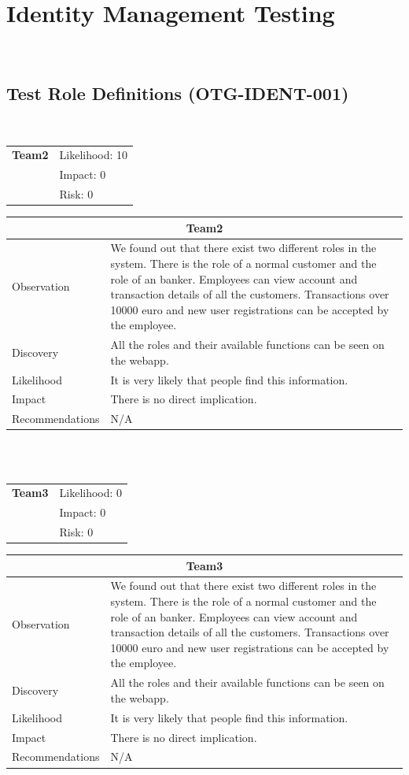 \documentclass[headsepline,footsepline,footinclude=false,oneside,fontsize=11pt,paper=a4,listof=totoc,bibliography=totoc]{scrbook} %
\begin{document}
\pagebreak
\section{Identity Management Testing}\
\subsection{Test Role Definitions (OTG-IDENT-001)}\
\begin{tabular}{cR{12cm}}
	\textbf{Team2} & Likelihood: 10\\& Impact: 0\\& Risk: 0
\end{tabular}

\begin{tabular}{ l|p{11cm}  }
	\hline
	\multicolumn{2}{c}{\textbf{Team2}} \\
	\hline
	Observation   & We found out that there exist two different roles in the system. There is the role of a normal customer and the role of an banker. Employees can view account and transaction details of all the customers. Transactions over 10000 euro and new user registrations can be accepted by the employee.\\
	Discovery  & All the roles and their available functions can be seen on the webapp.  \\
	Likelihood & It is very likely that people find this information. \\
	Impact    & There is no direct implication. \\
	Recommendations & N/A \\ 
	\hline
\end{tabular}
\\
\vspace{0.5cm}
\\
\begin{tabular}{cR{12cm}}
	\textbf{Team3} & Likelihood: 0\\& Impact: 0\\& Risk: 0
\end{tabular}

\begin{tabular}{ l|p{11cm}  }
	\hline
	\multicolumn{2}{c}{\textbf{Team3}} \\
	\hline
	Observation   & We found out that there exist two different roles in the system. There is the role of a normal customer and the role of an banker. Employees can view account and transaction details of all the customers. Transactions over 10000 euro and new user registrations can be accepted by the employee.\\
	Discovery  & All the roles and their available functions can be seen on the webapp.  \\
	Likelihood & It is very likely that people find this information. \\
	Impact    & There is no direct implication. \\
	Recommendations & N/A \\
	\hline
\end{tabular}
 
\end{document}
